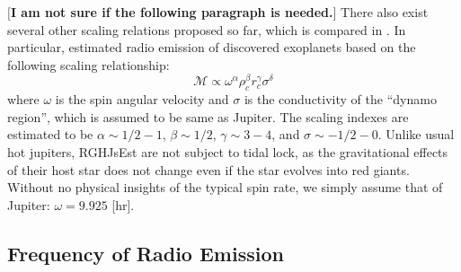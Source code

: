\documentclass{emulateapj}
\def\memoYF#1{\color{red}$[${\bf #1}$]$ \color{black}}
\def\memoDS#1{\color{blue}$[${\bf #1}$]$ \color{black}}
\begin{document}
\memoYF{I am not sure if the following paragraph is needed.}
There also exist several other scaling relations proposed so far, which is compared in \citet{christensen2010}. 
In particular, \citet{griebmeier2004} estimated radio emission of discovered exoplanets based on the following scaling relationship: 
\begin{equation}
\mathcal{M} \propto  \omega ^{\alpha } \rho_c ^{\beta } r_c^{\gamma } \sigma ^{\delta }
\end{equation}
where $\omega $ is the spin angular velocity and $\sigma $ is the conductivity of the ``dynamo region'', which is assumed to be same as Jupiter. 
The scaling indexes are estimated to be $\alpha \sim 1/2-1$, $\beta \sim 1/2$, $\gamma \sim 3-4$, and $\sigma \sim -1/2-0$. 
%
Unlike usual hot jupiters, RGHJsEst are not subject to tidal lock, as the gravitational effects of their host star does not change even if the star evolves into red giants. Without no physical insights of the typical spin rate, we simply assume that of Jupiter: $\omega = 9.925$ [hr]. 



\subsection{Frequency of Radio Emission}
\label{ss:model_frequency}

\end{document}
